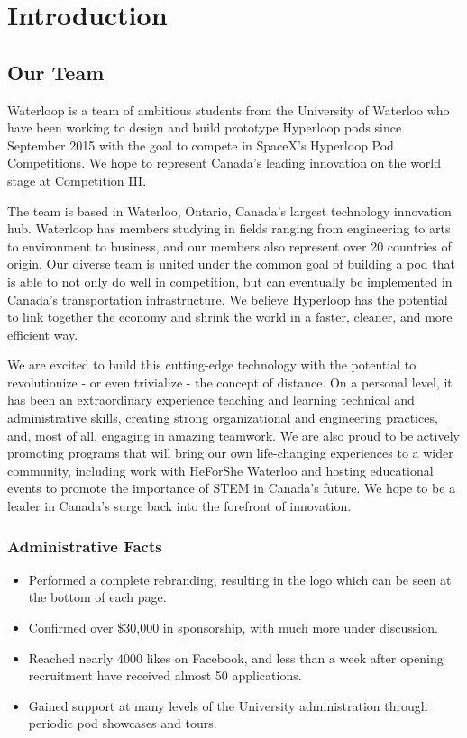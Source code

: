 \documentclass[main.tex]{subfiles}
\begin{document}
\chapter{Introduction}
\label{ch:intro}
\section{Our Team}
Waterloop is a team of ambitious students from the University of Waterloo who have been working to design and build prototype Hyperloop pods since September 2015 with the goal to compete in SpaceX's Hyperloop Pod Competitions. We hope to represent Canada's leading innovation on the world stage at Competition III.

The team is based in Waterloo, Ontario, Canada’s largest technology innovation hub. Waterloop has members studying in fields ranging from engineering to arts to environment to business, and our members also represent over 20 countries of origin. Our diverse team is united under the common goal of building a pod that is able to not only do well in competition, but can eventually be implemented in Canada's transportation infrastructure. We believe Hyperloop has the potential to link together the economy and shrink the world in a faster, cleaner, and more efficient way.

We are excited to build this cutting-edge technology with the potential to revolutionize - or even trivialize - the concept of distance. On a personal level, it has been an extraordinary experience teaching and learning technical and administrative skills, creating strong organizational and engineering practices, and, most of all, engaging in amazing teamwork. We are also proud to be actively promoting programs that will bring our own life-changing experiences to a wider community, including work with HeForShe Waterloo and hosting educational events to promote the importance of STEM in Canada's future. We hope to be a leader in Canada's surge back into the forefront of innovation.

\subsection{Administrative Facts}
\begin{itemize}
\item Performed a complete rebranding, resulting in the logo which can be seen at the bottom of each page.
\item Confirmed over \$30,000 in sponsorship, with much more under discussion.
\item Reached nearly 4000 likes on Facebook, and less than a week after opening recruitment have received almost 50 applications.
\item Gained support at many levels of the University administration through periodic pod showcases and tours.
\end{itemize}
\end{document}
